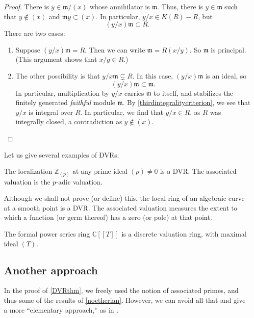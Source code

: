 \begin{proof}
There is $\overline{y} \in \mathfrak{m}/(x)$ whose annihilator is
$\mathfrak{m}$.
Thus, there is $y \in \mathfrak{m}$ such that $y \notin (x)$ and $\mathfrak{m}y
\subset (x)$. In particular, $y/x \in K(R) - R$, but
\[ (y/x) \mathfrak{m} \subset R.  \]
There are two cases:
\begin{enumerate}
\item Suppose $(y/x) \mathfrak{m}  = R$. Then we can write $\mathfrak{m} =
R(x/y)$. So $\mathfrak{m}$ is principal. (This argument shows that $x/y \in R$.)	
\item The other possibility is that $y/x \mathfrak{m} \subsetneq R$. In this
case, $(y/x)\mathfrak{m}$ is an ideal, so 
\[ (y/x) \mathfrak{m} \subset \mathfrak{m}.  \]
In particular, multiplication by $y/x$ carries $\mathfrak{m}$ to itself, and
stabilizes the finitely generated \emph{faithful} module
$\mathfrak{m}$. By \cref{thirdintegralitycriterion}, we see that
$y/x$ is integral over $R$. In particular, we find that $y/x \in R$, as $R$
was integrally closed, a contradiction as $y \notin (x)$. 
\end{enumerate}
\end{proof} 

Let us give several examples of DVRs.
\begin{example} 
The localization $\mathbb{Z}_{(p)}$ at any prime ideal $(p) \neq 0$ is a DVR.
The associated valuation is the $p$-adic valuation.
\end{example} 

\begin{example} 
Although we shall not prove (or define) this, the local ring of an
algebraic curve at a smooth point is a DVR. The associated valuation  measures the
extent to which a function (or germ thereof) has a zero (or pole) at  that
point.
\end{example} 

\begin{example} 
The formal power series ring $\mathbb{C}[[T]]$ is a discrete valuation ring,
with maximal ideal $(T)$. 
\end{example} 

\subsection{Another approach}

In the proof of \cref{DVRthm}, we freely used the notion of associated primes,
and thus some of the results of \cref{noetherian}.
However, we can avoid all that and give a more ``elementary approach,'' as in
\cite{CaF}.


